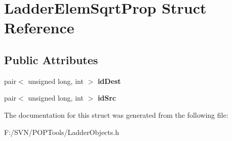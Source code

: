 \hypertarget{struct_ladder_elem_sqrt_prop}{\section{Ladder\-Elem\-Sqrt\-Prop Struct Reference}
\label{struct_ladder_elem_sqrt_prop}
}
\subsection*{Public Attributes}
\begin{DoxyCompactItemize}
\item 
\hypertarget{struct_ladder_elem_sqrt_prop_a82bcb5659418d1983ffe559e134faa6a}{pair$<$ unsigned long, int $>$ {\bfseries id\-Dest}}\label{struct_ladder_elem_sqrt_prop_a82bcb5659418d1983ffe559e134faa6a}

\item 
\hypertarget{struct_ladder_elem_sqrt_prop_adbfcf6ddf16fc49c199b0b893b91eeb5}{pair$<$ unsigned long, int $>$ {\bfseries id\-Src}}\label{struct_ladder_elem_sqrt_prop_adbfcf6ddf16fc49c199b0b893b91eeb5}

\end{DoxyCompactItemize}


The documentation for this struct was generated from the following file\-:\begin{DoxyCompactItemize}
\item 
F\-:/\-S\-V\-N/\-P\-O\-P\-Tools/Ladder\-Objects.\-h\end{DoxyCompactItemize}
